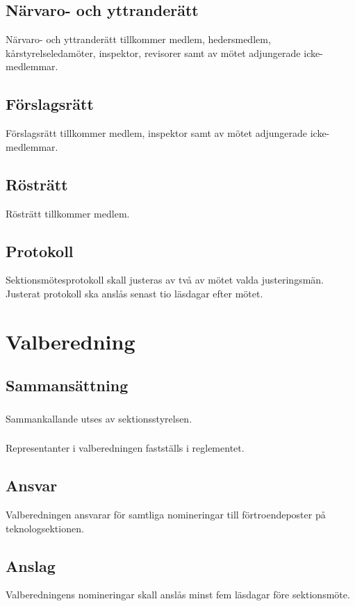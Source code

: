 \documentclass[a4paper, 10pt]{article}
\begin{document}
\subsection{Närvaro- och yttranderätt}
Närvaro- och yttranderätt tillkommer medlem, hedersmedlem, kårstyrelseledamöter, inspektor, revisorer samt av mötet adjungerade icke-medlemmar.
\subsection{Förslagsrätt}
Förslagsrätt tillkommer medlem, inspektor samt av mötet adjungerade icke-medlemmar.
\subsection{Rösträtt}
Rösträtt tillkommer medlem.
\subsection{Protokoll}
Sektionsmötesprotokoll skall justeras av två av mötet valda justeringsmän. Justerat protokoll ska anslås senast tio läsdagar efter mötet.
\newpage

\section{Valberedning}
\subsection{Sammansättning}
\subsubsection{}
Sammankallande utses av sektionsstyrelsen.
\subsubsection{}
Representanter i valberedningen fastställs i reglementet.
\subsection{Ansvar}
Valberedningen ansvarar för samtliga nomineringar till förtroendeposter på teknologsektionen.
\subsection{Anslag}
Valberedningens nomineringar skall anslås minst fem läsdagar före sektionsmöte.
\end{document}
